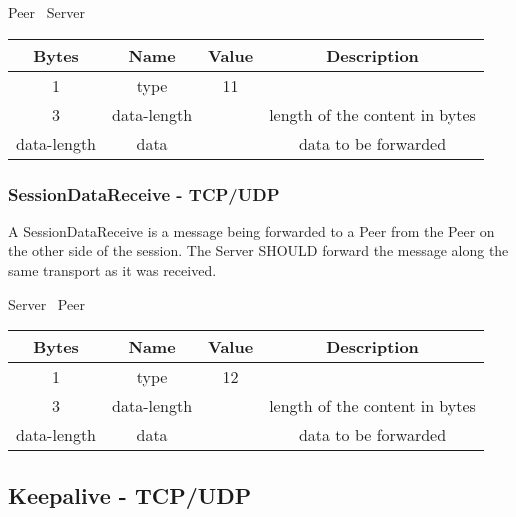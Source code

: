 \begin{center}
    Peer \textrightarrow\ Server\\
    \begin{tabular}{|c|c|c|c|}
        \hline
        \textbf{Bytes} & \textbf{Name} & \textbf{Value} & \textbf{Description}           \\
        \hline
        1              & type          & 11             &                                \\
        \hline
        3              & data-length   &                & length of the content in bytes \\
        \hline
        data-length    & data          &                & data to be forwarded           \\
        \hline
    \end{tabular}
\end{center}

\subsubsection{SessionDataReceive - TCP/UDP}

A SessionDataReceive is a message being forwarded to a Peer from the Peer on the other side of the
session. The Server SHOULD forward the message along the same transport as it was received.

\begin{center}
    Server \textrightarrow\ Peer\\
    \begin{tabular}{|c|c|c|c|}
        \hline
        \textbf{Bytes} & \textbf{Name} & \textbf{Value} & \textbf{Description}           \\
        \hline
        1              & type          & 12             &                                \\
        \hline
        3              & data-length   &                & length of the content in bytes \\
        \hline
        data-length    & data          &                & data to be forwarded           \\
        \hline
    \end{tabular}
\end{center}

\subsection{Keepalive - TCP/UDP}

